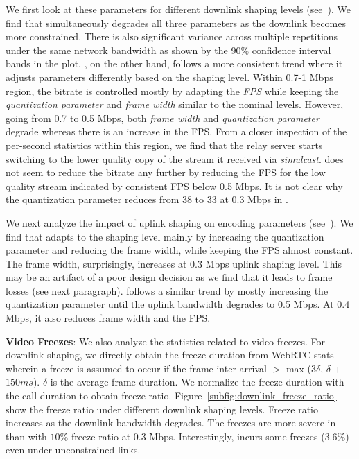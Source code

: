 We first look at these parameters for different downlink shaping levels (see~). We find that \teamsbrowser simultaneously degrades all three parameters as the downlink becomes more constrained. There is also significant variance across multiple repetitions under the same network bandwidth as shown by the $90\%$ confidence interval bands in the plot. \meet, on the other hand, follows a more consistent trend where it adjusts parameters differently based on the shaping level. Within 0.7-1 Mbps region, the bitrate is controlled mostly by adapting the \textit{FPS} while keeping the \textit{quantization parameter} and \textit{frame width} similar to the nominal levels. However, going from 0.7 to 0.5 Mbps, both \textit{frame width} and \textit{quantization parameter} degrade whereas there is an increase in the FPS. From a closer inspection of the per-second statistics within this region, we find that the relay server starts switching to the lower quality copy of the stream it received via \textit{simulcast}. \meet does not seem to reduce the bitrate any further by reducing the FPS for the low quality stream indicated by consistent FPS below 0.5 Mbps. It is not clear why the quantization parameter reduces from 38 to 33 at 0.3 Mbps in \meet. 

We next analyze the impact of uplink shaping on encoding parameters (see~). We find that \teams adapts to the shaping level mainly by increasing the quantization parameter and reducing the frame width, while keeping the FPS almost constant. The frame width, surprisingly, increases at 0.3 Mbps uplink shaping level. This may be an artifact of a poor design decision as we find that it leads to frame losses (see next paragraph). \meet follows a similar trend by mostly increasing the quantization parameter until the uplink bandwidth degrades to 0.5 Mbps. At 0.4 Mbps, it also reduces frame width and the FPS. 

\textbf{Video Freezes}: We also analyze the statistics related to video freezes. For downlink shaping, we directly obtain the freeze duration from WebRTC stats wherein a freeze is assumed to occur if the frame inter-arrival $>$ max (3$\delta$, $\delta$ + $150 ms$). $\delta$ is the average frame duration. We normalize the freeze duration with the call duration to obtain freeze ratio.  Figure~\ref{subfig:downlink_freeze_ratio} show the freeze ratio under different downlink shaping levels. Freeze ratio increases as the downlink bandwidth degrades. The freezes are more severe in \meet than \teamsbrowser with $10\%$ freeze ratio at 0.3 Mbps. Interestingly, \teamsbrowser incurs some freezes ($3.6\%$) even under unconstrained links. 

